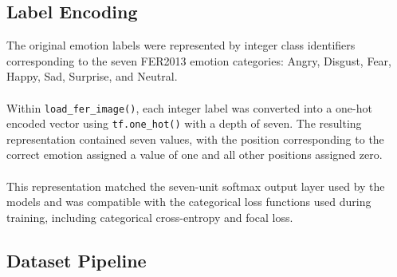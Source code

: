 \documentclass[12pt, a4paper]{report}
\let\oldsubsection\subsection
\renewcommand{\subsection}{%
    \Needspace{6\baselineskip}%
    \oldsubsection
}
\begin{document}
			\subsection{Label Encoding}
				
				The original emotion labels were represented by integer class identifiers corresponding to the seven FER2013 emotion categories: Angry, Disgust, Fear, Happy, Sad, Surprise, and Neutral.\\\\
				Within \texttt{load\_fer\_image()}, each integer label was converted into a one-hot encoded vector using \texttt{tf.one\_hot()} with a depth of seven. The resulting representation contained seven values, with the position corresponding to the correct emotion assigned a value of one and all other positions assigned zero.\\\\
				This representation matched the seven-unit softmax output layer used by the models and was compatible with the categorical loss functions used during training, including categorical cross-entropy and focal loss.
				
			\subsection{Dataset Pipeline}
				
\end{document}
